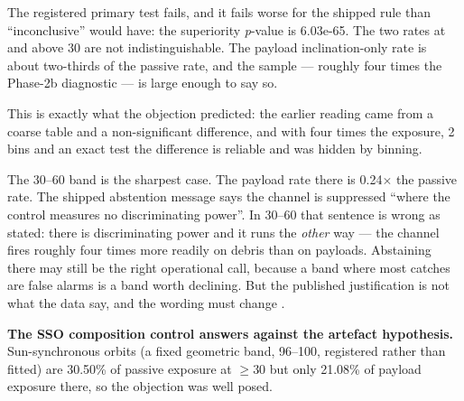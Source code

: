 \documentclass[11pt]{article}
\begin{document}

The registered primary test fails, and it fails worse for the shipped rule than ``inconclusive'' would have: the superiority \emph{p}-value is 6.03e-65. The two rates at and above 30\textdegree{} are not indistinguishable. The payload inclination-only rate is about two-thirds of the passive rate, and the sample --- roughly four times the Phase-2b diagnostic --- is large enough to say so.

This is exactly what the objection predicted: the earlier reading came from a coarse table and a non-significant difference, and with four times the exposure, 2\textdegree{} bins and an exact test the difference is reliable and was hidden by binning.

The 30--60\textdegree{} band is the sharpest case. The payload rate there is 0.24$\times$ the passive rate. The shipped abstention message says the channel is suppressed ``where the control measures no discriminating power''. In 30--60\textdegree{} that sentence is wrong as stated: there is discriminating power and it runs the \emph{other} way --- the channel fires roughly four times more readily on debris than on payloads. Abstaining there may still be the right operational call, because a band where most catches are false alarms is a band worth declining. But the published justification is not what the data say, and the wording must change%
.

\textbf{The SSO composition control answers against the artefact hypothesis.} Sun-synchronous orbits (a fixed geometric band, 96--100\textdegree{}, registered rather than fitted) are 30.50\% of passive exposure at $\ge$30\textdegree{} but only 21.08\% of payload exposure there, so the objection was well posed.
\end{document}
